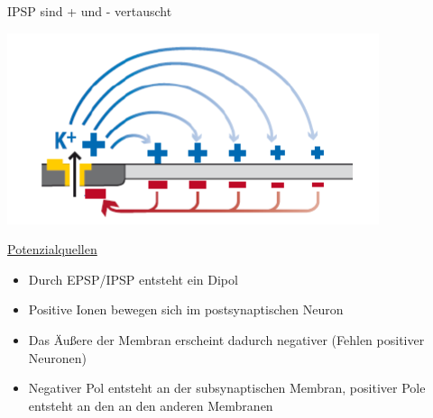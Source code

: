 \documentclass[a4paper,10pt,oneside]{article}
\begin{document}
IPSP sind + und - vertauscht 

\includegraphics[scale=0.2]{Grafiken/19111.png}

\underline{Potenzialquellen} \\
	\begin{itemize}
		\item Durch EPSP/IPSP entsteht ein Dipol
		\item Positive Ionen bewegen sich im postsynaptischen Neuron
		\item Das Äußere der Membran erscheint dadurch negativer (Fehlen positiver Neuronen)
		\item Negativer Pol entsteht an der subsynaptischen Membran, positiver Pole entsteht an den an den anderen Membranen
	\end{itemize}
 		
\end{document}
